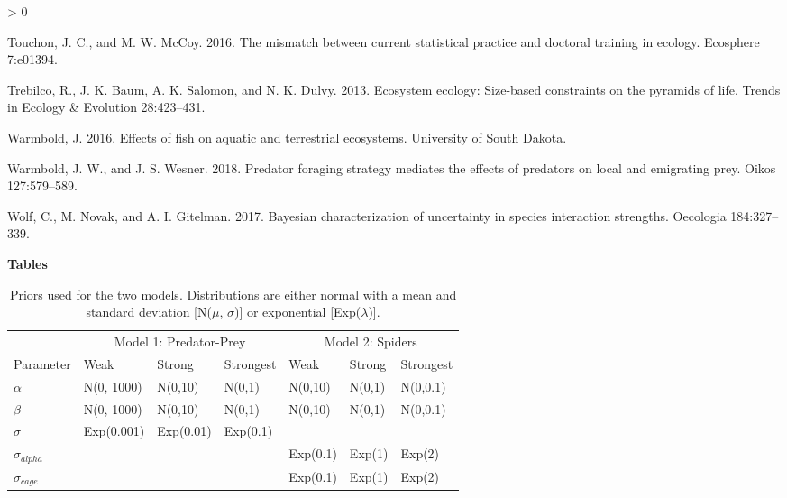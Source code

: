 \documentclass[
  12pt,
]{article}
\newlength{\cslhangindent}
\newenvironment{CSLReferences}[2] %
 {%
  \setlength{\parindent}{0pt}
  \ifodd #1 \everypar{\setlength{\hangindent}{\cslhangindent}}\ignorespaces\fi
  \ifnum #2 > 0
  \setlength{\parskip}{#2\baselineskip}
  \fi
 }%
 {}
\begin{document}
\begin{CSLReferences}{1}{0}
\leavevmode\hypertarget{ref-touchon_mismatch_2016}{}%
Touchon, J. C., and M. W. McCoy. 2016. The mismatch between current
statistical practice and doctoral training in ecology. Ecosphere
7:e01394.

\leavevmode\hypertarget{ref-trebilco_ecosystem_2013}{}%
Trebilco, R., J. K. Baum, A. K. Salomon, and N. K. Dulvy. 2013.
Ecosystem ecology: Size-based constraints on the pyramids of life.
Trends in Ecology \& Evolution 28:423--431.

\leavevmode\hypertarget{ref-warmbold_effects_2016}{}%
Warmbold, J. 2016. Effects of fish on aquatic and terrestrial
ecosystems. University of South Dakota.

\leavevmode\hypertarget{ref-warmbold_predator_2018}{}%
Warmbold, J. W., and J. S. Wesner. 2018. Predator foraging strategy
mediates the effects of predators on local and emigrating prey. Oikos
127:579--589.

\leavevmode\hypertarget{ref-wolf_bayesian_2017}{}%
Wolf, C., M. Novak, and A. I. Gitelman. 2017. Bayesian characterization
of uncertainty in species interaction strengths. Oecologia 184:327--339.

\end{CSLReferences}

\newpage
\renewcommand{\arraystretch}{2}

\textbf{Tables}

\begin{table}[!h]

\caption{\label{tab:unnamed-chunk-1}Priors used for the two models. Distributions are either normal with a mean and standard deviation [N($\mu$, $\sigma$)] or exponential [Exp($\lambda$)].}
\centering
\begin{tabular}[t]{lllllll}
\toprule
\multicolumn{1}{c}{ } & \multicolumn{3}{c}{Model 1: Predator-Prey} & \multicolumn{3}{c}{Model 2: Spiders} \\
\cmidrule(l{3pt}r{3pt}){2-4} \cmidrule(l{3pt}r{3pt}){5-7}
Parameter & Weak & Strong & Strongest & Weak & Strong & Strongest\\
\midrule
$\alpha$ & N(0, 1000) & N(0,10) & N(0,1) & N(0,10) & N(0,1) & N(0,0.1)\\
$\beta$ & N(0, 1000) & N(0,10) & N(0,1) & N(0,10) & N(0,1) & N(0,0.1)\\
$\sigma$ & Exp(0.001) & Exp(0.01) & Exp(0.1) &  &  & \\
$\sigma_{alpha}$ &  &  &  & Exp(0.1) & Exp(1) & Exp(2)\\
$\sigma_{cage}$ &  &  &  & Exp(0.1) & Exp(1) & Exp(2)\\
\bottomrule
\end{tabular}
\end{table}
\end{document}
